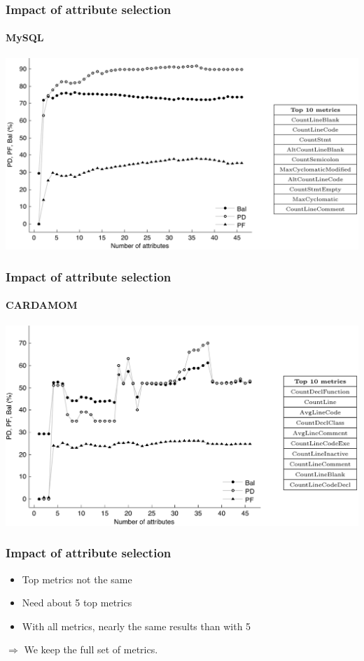\documentclass{beamer}
\begin{document}
\begin{frame}
 \frametitle{Impact of attribute selection}
 \framesubtitle{MySQL}
 \begin{center}
  \includegraphics[width=\textwidth]{figures/attributesMysql.png}
 \end{center}
\end{frame}

\begin{frame}
 \frametitle{Impact of attribute selection}
 \framesubtitle{CARDAMOM}
 \begin{center}
  \includegraphics[width=\textwidth]{figures/attributesCardamom.png}
 \end{center}
\end{frame}

\begin{frame}
 \frametitle{Impact of attribute selection}
 \begin{itemize}
  \item Top metrics not the same
  \item Need about 5 top metrics
  \item With all metrics, nearly the same results than with 5
 \end{itemize}
 \vspace{0.5cm}
 \begin{center}
  $\Longrightarrow$ \alert{We keep the full set of metrics.}
 \end{center}
\end{frame}
\end{document}
